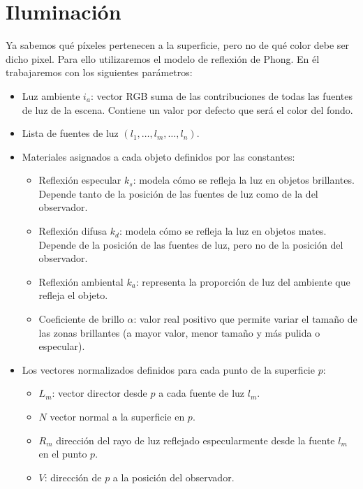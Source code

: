 \section{Iluminación}
Ya sabemos qué píxeles pertenecen a la superficie, pero no de qué color debe ser dicho pixel. Para ello utilizaremos el modelo de reflexión de Phong. En él trabajaremos con los siguientes parámetros:
\begin{itemize}
  \item Luz ambiente $i_a$: vector RGB suma de las contribuciones de todas las fuentes de luz de la escena. Contiene un valor por defecto que será el color del fondo.
  \item Lista de fuentes de luz $(l_1, \dots, l_m, \dots, l_n)$.
  \item Materiales asignados a cada objeto definidos por las constantes:
      \begin{itemize}
          \item Reflexión especular $k_s$: modela cómo se refleja la luz en objetos brillantes. Depende tanto de la posición de las fuentes de luz como de la del observador.
          \item Reflexión difusa $k_d$: modela cómo se refleja la luz en objetos mates. Depende de la posición de las fuentes de luz, pero no de la posición del observador.
          \item Reflexión ambiental $k_a$: representa la proporción de luz del ambiente que refleja el objeto.
          \item Coeficiente de brillo $\alpha$: valor real positivo que permite variar el tamaño de las zonas brillantes (a mayor valor, menor tamaño y más pulida o especular).
      \end{itemize}
  
  \item Los vectores normalizados definidos para cada punto de la superficie $p$:
        \begin{itemize}
          \item $L_m$: vector director desde $p$ a cada fuente de luz $l_m$.
          \item $N$ vector normal a la superficie en $p$.
          \item $R_m$ dirección del rayo de luz reflejado especularmente desde la fuente $l_m$ en el punto $p$.
          \item $V$: dirección de $p$ a la posición del observador.
        \end{itemize}
\end{itemize}

